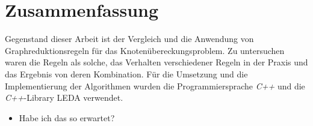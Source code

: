 \chapter*{Zusammenfassung}
Gegenstand dieser Arbeit ist der Vergleich und die Anwendung von Graphreduktionsregeln für das Knotenübereckungsproblem. Zu untersuchen waren die Regeln als solche, das Verhalten verschiedener Regeln in der Praxis und das Ergebnis von deren Kombination. Für die Umsetzung und die Implementierung der Algorithmen wurden die Programmiersprache \emph{C++} und die \emph{C++}-Library LEDA verwendet.

\begin{itemize}
\item Habe ich das so erwartet?
\end{itemize}